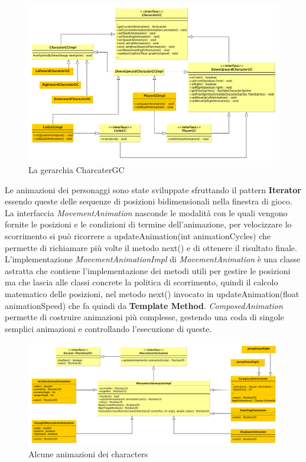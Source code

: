 \documentclass[a4paper,12pt, hidelinks]{report}
\begin{document}
\begin{figure}[H]
\centering{}
\includegraphics[width=\linewidth]{img/GerarchiaCGC}
\caption{La gerarchia CharcaterGC}
\label{img:GerarchiaCGC}
\end{figure}

Le animazioni dei personaggi sono state sviluppate sfruttando il pattern \textbf{Iterator} essendo queste delle sequenze di posizioni bidimensionali nella finestra di gioco. La interfaccia \emph{MovementAnimation} nasconde le modalità con le quali vengono fornite le posizioni e le condizioni di termine dell’animazione, per velocizzare lo scorrimento si può ricorrere a updateAnimation(int animationCycles) che permette di richiamare più volte il metodo next() e di ottenere il risultato finale. L’implementazione \emph{MovementAnimationImpl} di \emph{MovementAnimation} è una classe astratta che contiene l’implementazione dei metodi utili per gestire le posizioni ma che lascia alle classi concrete la politica di scorrimento, quindi il calcolo matematico delle posizioni, nel metodo next() invocato in updateAnimation(float animationSpeed) che fa quindi da \textbf{Template Method}. \emph{ComposedAnimation} permette di costruire animazioni più complesse, gestendo una coda di singole semplici animazioni e controllando l'esecuzione di queste.

\begin{figure}[H]
\centering{}
\includegraphics[width=\linewidth]{img/AnimazioniPersonaggi}
\caption{Alcune animazioni dei characters}
\label{img:AnimazioniPersonaggi}
\end{figure}
\end{document}
